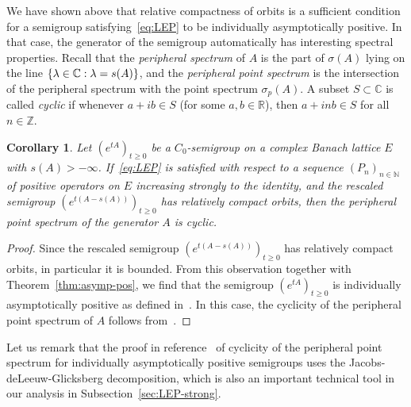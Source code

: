 \documentclass[a4paper, reqno]{amsart}
\numberwithin{equation}{section}
\theoremstyle{plain}
\newtheorem{corollary}[theorem]{Corollary}
\theoremstyle{definition}
\theoremstyle{remark}
\let\Re\relax
\DeclareMathOperator{\Re}{Re}
\newcommand{\NN}{\mathbb{N}}
\newcommand{\ZZ}{\mathbb{Z}}
\newcommand{\RR}{\mathbb{R}}
\newcommand{\CC}{\mathbb{C}}
\begin{document}
We have shown above that relative compactness of orbits is a sufficient condition for a semigroup satisfying~\eqref{eq:LEP} to be individually asymptotically positive. In that case, the generator of the semigroup automatically has interesting spectral properties. Recall that the \emph{peripheral spectrum} of $A$ is the part of $\sigma(A)$ lying on the line $\{\lambda\in\CC : \Re\lambda = s(A)\}$, and the \emph{peripheral point spectrum} is the intersection of the peripheral spectrum with the point spectrum $\sigma_p(A)$. A subset $S\subset\CC$ is called \emph{cyclic} if whenever $a+ib \in S$ (for some $a,b\in\RR$), then $a+inb\in S$ for all $n\in\ZZ$.
\begin{corollary}
	\label{cor:cyclic}
	Let $(e^{tA})_{t\ge 0}$ be a $C_0$-semigroup on a complex Banach lattice $E$ with $s(A)>-\infty$. If~\eqref{eq:LEP} is satisfied with respect to a sequence $(P_n)_{n\in\NN}$ of positive operators on $E$ increasing strongly to the identity, and the rescaled semigroup $(e^{t(A-s(A))})_{t\ge 0}$ has relatively compact orbits, then the peripheral point spectrum of the generator $A$ is cyclic.
\end{corollary}
\begin{proof}
	Since the rescaled semigroup $(e^{t(A-s(A))})_{t\ge 0}$ has relatively compact orbits, in particular it is bounded. From this observation together with Theorem~\ref{thm:asymp-pos}, we find that the semigroup $(e^{tA})_{t\ge 0}$ is individually asymptotically positive as defined in~\cite[Definition 8.1]{DGK2}. In this case, the cyclicity of the peripheral point spectrum of $A$ follows from~\cite[Theorem 6.3.2]{GTh}.
\end{proof}
Let us remark that the proof in reference~\cite{GTh} of cyclicity of the peripheral point spectrum for individually asymptotically positive semigroups uses the Jacobs-deLeeuw-Glicksberg decomposition, which is also an important technical tool in our analysis in Subsection~\ref{sec:LEP-strong}.
\end{document}

